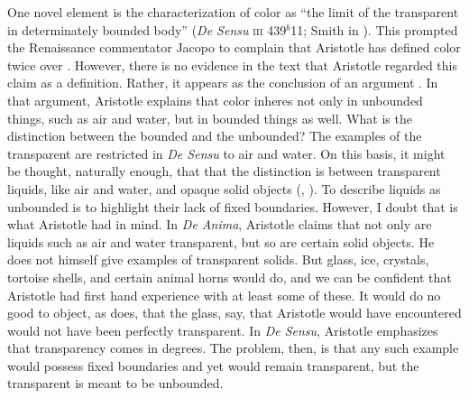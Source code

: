 One novel element is the characterization of color as ``the limit of the transparent in determinately bounded body'' (\emph{De Sensu} \textsc{iii} 439\( ^{b} \)11; Smith in \citealt[8]{Barnes:1984uq}). This prompted the Renaissance commentator Jacopo \citet{Zabarella:1605kx} to complain that Aristotle has defined color twice over \citep{Broackes:1999uq}. However, there is no evidence in the text that Aristotle regarded this claim as a definition. Rather, it appears as the conclusion of an argument \citep[65]{Broackes:1999uq}. In that argument, Aristotle explains that color inheres not only in unbounded things, such as air and water, but in bounded things as well. What is the distinction between the bounded and the unbounded? The examples of the transparent are restricted in \emph{De Sensu} to air and water. On this basis, it might be thought, naturally enough, that that the distinction is between transparent liquids, like air and water, and opaque solid objects (\citealt[59]{Broackes:1999uq}, \citealt[131]{Sorabji:2004fk}). To describe liquids as unbounded is to highlight their lack of fixed boundaries. However, I doubt that is what Aristotle had in mind. In \emph{De Anima}, Aristotle claims that not only are liquids such as air and water transparent, but so are certain solid objects. He does not himself give examples of transparent solids. But glass, ice, crystals, tortoise shells, and certain animal horns would do, and we can be confident that Aristotle had first hand experience with at least some of these. It would do no good to object, as \citet[131]{Sorabji:2004fk} does, that the glass, say, that Aristotle would have encountered would not have been perfectly transparent. In \emph{De Sensu}, Aristotle emphasizes that transparency comes in degrees. The problem, then, is that any such example would possess fixed boundaries and yet would remain transparent, but the transparent is meant to be unbounded. 

